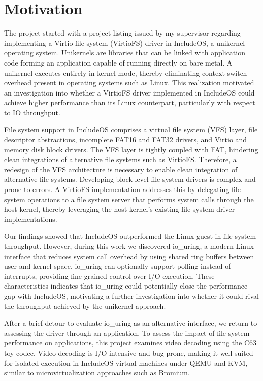 \section{Motivation}
The project started with a project listing issued by my supervisor regarding implementing a Virtio file system (VirtioFS) driver in IncludeOS, a unikernel operating system. Unikernels are libraries that can be linked with application code forming an application capable of running directly on bare metal. A unikernel executes entirely in kernel mode, thereby eliminating context switch overhead present in operating systems such as Linux. This realization motivated an investigation into whether a VirtioFS driver implemented in IncludeOS could achieve higher performance than its Linux counterpart, particularly with respect to IO throughput.

File system support in IncludeOS comprises a virtual file system (VFS) layer, file descriptor abstractions, incomplete FAT16 and FAT32 drivers, and Virtio and memory disk block drivers. The VFS layer is tightly coupled with FAT, hindering clean integrations of alternative file systems such as VirtioFS. Therefore, a redesign of the VFS architecture is necessary to enable clean integration of alternative file systems. Developing block-level file system drivers is complex and prone to errors. A VirtioFS implementation addresses this by delegating file system operations to a file system server that performs system calls through the host kernel, thereby leveraging the host kernel’s existing file system driver implementations.

Our findings showed that IncludeOS outperformed the Linux guest in file system throughput. However, during this work we discovered io\_uring, a modern Linux interface that reduces system call overhead by using shared ring buffers between user and kernel space. io\_uring can optionally support polling instead of interrupts, providing fine-grained control over I/O execution. These characteristics indicates that io\_uring could potentially close the performance gap with IncludeOS, motivating a further investigation into whether it could rival the throughput achieved by the unikernel approach.

After a brief detour to evaluate io\_uring as an alternative interface, we return to assessing the driver through an application. To assess the impact of file system performance on applications, this project examines video decoding using the C63 toy codec. Video decoding is I/O intensive and bug-prone, making it well suited for isolated execution in IncludeOS virtual machines under QEMU and KVM, similar to microvirtualization approaches such as Bromium.

